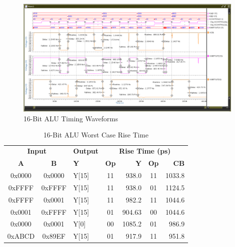 \documentclass[11pt]{article}
\begin{document}
		
			\begin{figure}[H]
				\centering
				\includegraphics[width=1\linewidth]{"Pictures/ALU 16-Bit Full Timing"}
				\caption{16-Bit ALU Timing Waveforms}
				\label{fig:alu-16-bit-full-timing}
			\end{figure}
			
		
			\begin{table}[H]
				\centering
				\caption{16-Bit ALU Worst Case Rise Time}
				\label{tab:ALU-16-Bit-Risetime}
				\begin{tabular}{|cclcrcr|}
					\hline
					\multicolumn{2}{|c}{\textbf{Input}} & \textbf{Output} & \multicolumn{4}{c|}{\textbf{Rise Time (ps)}} \\
					\textbf{A} & \textbf{B} & \textbf{Y} & \textbf{Op} & \textbf{Y} & \textbf{Op} & \textbf{CB} \\
					\hline
					0x0000 & 0x0000 & Y{[}15{]} & 11 & 938.0 & 11 & 1033.8 \\
					0xFFFF & 0xFFFF & Y{[}15{]} & 11 & 938.0 & 01 & 1124.5 \\
					0xFFFF & 0x0001 & Y{[}15{]} & 11 & 982.2 & 11 & 1044.6 \\
					0x0001 & 0xFFFF & Y{[}15{]} & 01 & 904.63 & 00 & 1044.6 \\
					0x0000 & 0x0001 & Y{[}0{]} & 00 & 1085.2 & 01 & 986.9 \\
					0xABCD & 0x89EF & Y{[}15{]} & 01 & 917.9 & 11 & 951.8 \\
					\hline
				\end{tabular}
			\end{table}
		
\end{document}

